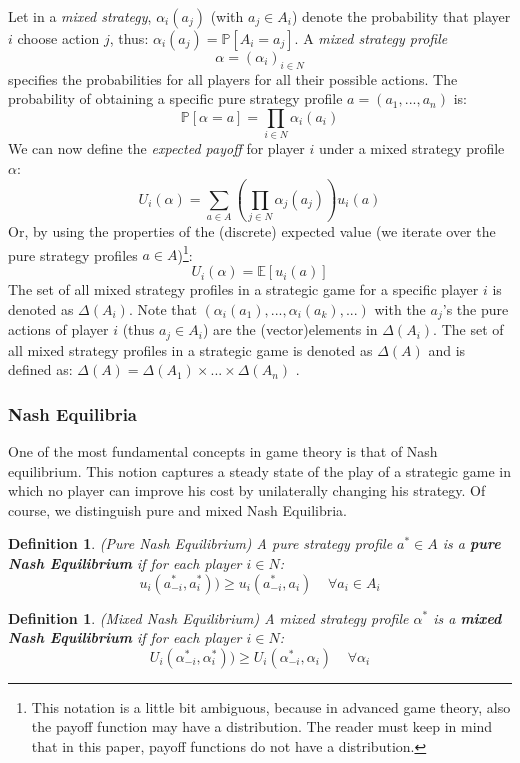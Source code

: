 \documentclass[a4paper,11pt]{article}
\newtheorem{definition}[theorem]{Definition}
\renewcommand{\P}{{\mathbb P}}
\newcommand{\E}{{\mathbb E}}
\begin{document}
Let in a \emph{mixed strategy}, $\alpha_i(a_j)$ (with $a_j \in A_i$) denote the probability that player $i$ choose action $j$, thus: $\alpha_i(a_j) = \P[A_i = a_j]$. A \emph{mixed strategy profile} $$\alpha = \left(\alpha_i\right)_{i\in N}$$ specifies the probabilities for all players for all their possible actions. The probability of obtaining a specific pure strategy profile $a = (a_1,...,a_n)$ is:
$$\P[\alpha = a] = \displaystyle\prod_{i \in N} \alpha_i(a_i)$$
 We can now define the \emph{expected payoff} for player $i$ under a mixed strategy profile $\alpha$:
$$U_i(\alpha) = \displaystyle\sum_{a \in A}{\left(\prod_{j \in N}{\alpha_j(a_j)}\right) u_i(a)}$$
Or, by using the properties of the (discrete) expected value (we iterate over the pure strategy profiles $a \in A$)\footnote[1]{This notation is a little bit ambiguous, because in advanced game theory, also the payoff function may have a distribution. The reader must keep in mind that in this paper, payoff functions do not have a distribution.}:
$$U_i(\alpha) = \E[u_i(a)]$$
The set of all mixed strategy profiles in a strategic game for a specific player $i$ is denoted as $\Delta(A_i)$. Note that $(\alpha_i(a_1),...,\alpha_i(a_k),...)$ with the $a_j$'s the pure actions of player $i$ (thus $a_j \in A_i$) are the (vector)elements in $\Delta(A_i)$. The set of all mixed strategy profiles in a strategic game is denoted as $\Delta(A)$ and is defined as: $\Delta(A) = \Delta(A_1) \times ... \times \Delta(A_n)$ .


\subsubsection{Nash Equilibria}
One of the most fundamental concepts in game theory is that of Nash equilibrium. This notion captures a steady state of the play of a strategic game in which no player can improve his cost by unilaterally changing his strategy. Of course, we distinguish pure and mixed Nash Equilibria.

\begin{definition}(Pure Nash Equilibrium) \cite{6}
A pure strategy profile $a^* \in A$ is a \textbf{pure Nash Equilibrium} if for each player $i\in N$:
$$u_i(a_{-i}^*,a_i^*)) \geq u_i(a_{-i}^*, a_i) \;\;\;\; \forall a_i \in A_i$$
\end{definition}

\begin{definition}(Mixed Nash Equilibrium)\cite{10}
A mixed strategy profile $\alpha^*$ is a \textbf{mixed Nash Equilibrium} if for each player $i \in N$:
$$U_i(\alpha_{-i}^*,\alpha_i^*)) \geq U_i(\alpha_{-i}^*, \alpha_i) \;\;\;\; \forall \alpha_i$$
\end{definition}
\end{document}
